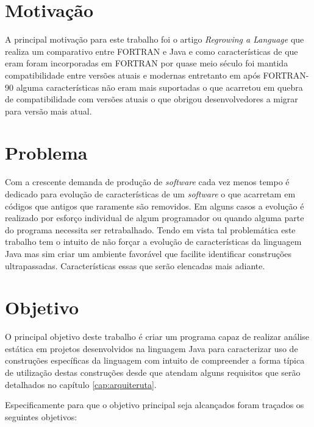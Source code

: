 \section{Motivação}
A principal motivação para este trabalho foi o artigo \textit{Regrowing a Language} \cite{Overbey:2009} que realiza um comparativo entre FORTRAN e Java  e como características de que eram foram incorporadas em FORTRAN por quase meio século foi mantida compatibilidade entre versões atuais e modernas entretanto em após FORTRAN-90 alguma características não eram mais suportadas o que acarretou em quebra de compatibilidade com versões atuais o que obrigou desenvolvedores a migrar para versão mais atual.

\section{Problema}
Com a crescente demanda de produção de \textit{software} cada vez menos tempo é dedicado para evolução de características de um \textit{software} o que acarretam em códigos que antigos que raramente são removidos. Em alguns casos a evolução é realizado por esforço individual de algum programador ou quando alguma parte do programa necessita ser retrabalhado. Tendo em vista tal problemática este trabalho tem o intuito de não forçar a evolução de características da linguagem Java mas sim criar um ambiente favorável que facilite identificar construções ultrapassadas. Características essas que serão elencadas mais adiante.

\section{Objetivo}
O principal objetivo deste trabalho é criar um programa capaz de realizar análise estática em projetos desenvolvidos na linguagem Java para caracterizar uso de construções específicas da linguagem com intuito de compreender a forma típica de utilização destas construções desde que atendam alguns requisitos que serão detalhados no capítulo \ref{cap:arquiteruta}.
	
Especificamente para que o objetivo principal seja alcançados foram traçados os seguintes objetivos:

